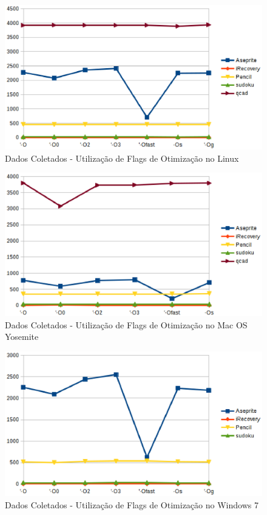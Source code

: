         
\begin{figure}[!h]
    \centering
        \includegraphics{figuras/graficos/linux_otimizacao.eps}
    \caption{Dados Coletados - Utilização de Flags de Otimização no Linux}
    \label{flags_de_otimizacao_linux}
\end{figure}

\begin{figure}[!h]
    \centering
        \includegraphics{figuras/graficos/mac_os_otimizacao.eps}
    \caption{Dados Coletados - Utilização de Flags de Otimização no Mac OS Yosemite}
    \label{flags_de_otimizacao_mac_os}
\end{figure}


\begin{figure}[!h]
    \centering
        \includegraphics{figuras/graficos/windows_otimizacao.eps}
    \caption{Dados Coletados - Utilização de Flags de Otimização no Windows 7}
    \label{flags_de_otimizacao_windows}
\end{figure}

